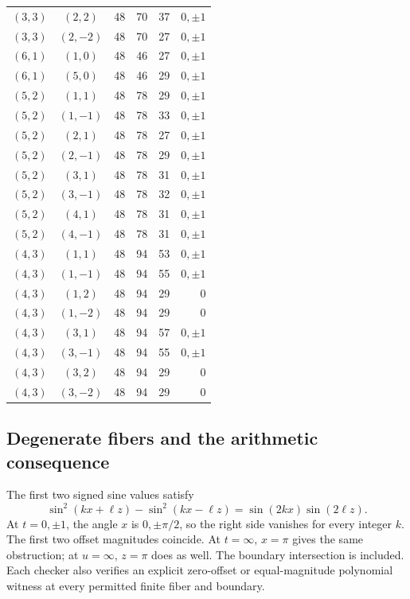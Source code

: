 \documentclass[11pt,letterpaper]{article}
\theoremstyle{definition}\newtheorem{definition}[theorem]{Definition}
\theoremstyle{remark}\newtheorem{remark}[theorem]{Remark}
\begin{document}
\begin{longtable}{ccrrrr}
$(3,3)$ & $(2,2)$ & 48 & 70 & 37 & $0,\pm1$ \\
$(3,3)$ & $(2,-2)$ & 48 & 70 & 27 & $0,\pm1$ \\
$(6,1)$ & $(1,0)$ & 48 & 46 & 27 & $0,\pm1$ \\
$(6,1)$ & $(5,0)$ & 48 & 46 & 29 & $0,\pm1$ \\
$(5,2)$ & $(1,1)$ & 48 & 78 & 29 & $0,\pm1$ \\
$(5,2)$ & $(1,-1)$ & 48 & 78 & 33 & $0,\pm1$ \\
$(5,2)$ & $(2,1)$ & 48 & 78 & 27 & $0,\pm1$ \\
$(5,2)$ & $(2,-1)$ & 48 & 78 & 29 & $0,\pm1$ \\
$(5,2)$ & $(3,1)$ & 48 & 78 & 31 & $0,\pm1$ \\
$(5,2)$ & $(3,-1)$ & 48 & 78 & 32 & $0,\pm1$ \\
$(5,2)$ & $(4,1)$ & 48 & 78 & 31 & $0,\pm1$ \\
$(5,2)$ & $(4,-1)$ & 48 & 78 & 31 & $0,\pm1$ \\
$(4,3)$ & $(1,1)$ & 48 & 94 & 53 & $0,\pm1$ \\
$(4,3)$ & $(1,-1)$ & 48 & 94 & 55 & $0,\pm1$ \\
$(4,3)$ & $(1,2)$ & 48 & 94 & 29 & $0$ \\
$(4,3)$ & $(1,-2)$ & 48 & 94 & 29 & $0$ \\
$(4,3)$ & $(3,1)$ & 48 & 94 & 57 & $0,\pm1$ \\
$(4,3)$ & $(3,-1)$ & 48 & 94 & 55 & $0,\pm1$ \\
$(4,3)$ & $(3,2)$ & 48 & 94 & 29 & $0$ \\
$(4,3)$ & $(3,-2)$ & 48 & 94 & 29 & $0$ \\
\bottomrule
\end{longtable}

\subsection{Degenerate fibers and the arithmetic consequence}
The first two signed sine values satisfy
\begin{equation}\label{eq:collision}
\sin^2(kx+\ell z)-\sin^2(kx-\ell z)
=\sin(2kx)\sin(2\ell z).
\end{equation}
At $t=0,\pm1$, the angle $x$ is $0,\pm\pi/2$, so the right side vanishes for every integer $k$. The first two offset magnitudes coincide. At $t=\infty$, $x=\pi$ gives the same obstruction; at $u=\infty$, $z=\pi$ does as well. The boundary intersection is included. Each checker also verifies an explicit zero-offset or equal-magnitude polynomial witness at every permitted finite fiber and boundary.
\end{document}
